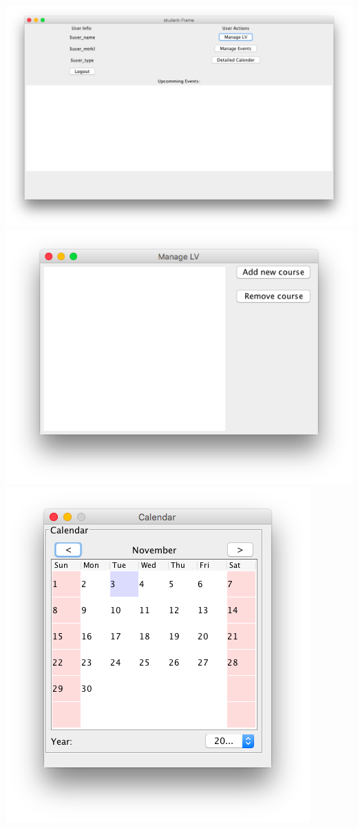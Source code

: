 \documentclass[a4paper,12pt]{article}
\begin{document}
\begin{center}
		\includegraphics[scale=.4]{Student.png}
		\includegraphics[scale=.6]{ManageLV.png}
		\includegraphics[scale=.6]{Calendar.png}
	\end{center}
\end{document}
